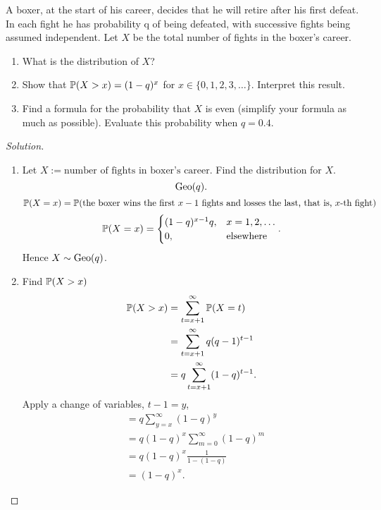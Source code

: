 \documentclass[10pt, a4paper]{article}
\begin{document}
\begin{problem}[97]
    A boxer,
    at the start of his career,
    decides that he will retire after his first defeat.
    In each fight he has
    probability q of being defeated,
    with successive fights being assumed independent.
    Let $X$ be the total number of fights in the boxer’s career.
    \begin{enumerate}[label = (\alph*)]
        \item What is the distribution of $X$?
        \item Show that $\P(X > x) = (1 - q) ^ x$ for $x \in \{0, 1, 2, 3, \dotsc\}$.
        Interpret this result.
        \item Find a formula for the probability that $X$ is even
        (simplify your formula as much as possible).
        Evaluate this probability when $q = 0.4$.
    \end{enumerate}

    \begin{proof}[Solution]\renewcommand{\qedsymbol}{}\phantom{}
    \begin{enumerate}[label = (\alph*)]
        \item
        Let $X := \text{number of fights in boxer's career}$.
        Find the distribution for $X$.
        \[
        \Geo(q).
        \]
        \[
        \P(X = x) = \P(\text{the boxer wins the first $x - 1$ fights and losses the last,
        that is,
        $x$-th fight})
        \]
        \[
        \P(X = x) = \begin{cases}
            (1 - q) ^ {x - 1}q, &x = 1, 2, \dotsc \\
            0, &\text{elsewhere}
        \end{cases}.
        \]
        Hence $X \sim \Geo(q)$.
        \item Find $\P(X > x)$
        \begin{align*}
            \P(X > x) &= \sum_{t = x + 1}^{\infty}\P(X = t) \\
            &= \sum_{t = x + 1}^{\infty}q(q - 1) ^ {t - 1} \\
            &= q\sum_{t = x + 1}^{\infty}(1 - q) ^ {t - 1}.
        \end{align*}
        Apply a change of variables,
        $t - 1 = y$,
        \begin{align*}
            &= q \sum_{y = x}^{\infty}(1 - q) ^ y \\
            &= q(1 - q) ^ x \sum_{m = 0}^{\infty}(1 - q) ^ m \\
            &= q(1 - q) ^ x \frac{1}{1 - (1 - q)} \\
            &= (1 - q) ^ x.
        \end{align*}
    \end{enumerate}
    \end{proof}
\end{problem}
\end{document}
